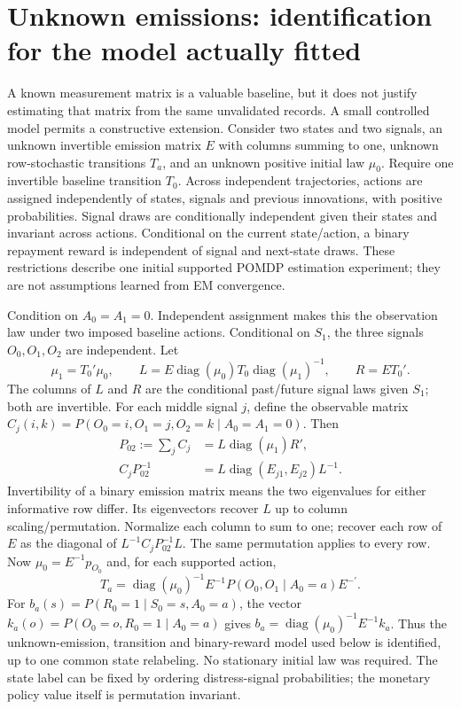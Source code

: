 \section{Unknown emissions: identification for the model actually fitted}
\label{s4:unknown-emission}
A known measurement matrix is a valuable baseline, but it does not justify
estimating that matrix from the same unvalidated records. A small controlled
model permits a constructive extension. Consider two states and two signals,
an unknown invertible emission matrix $E$ with columns summing to one,
unknown row-stochastic transitions $T_a$, and an unknown positive initial
law $\mu_0$. Require one invertible baseline transition $T_0$. Across
independent trajectories, actions are assigned independently of states,
signals and previous innovations, with positive probabilities. Signal
draws are conditionally independent given their states and invariant across
actions. Conditional on the current state/action, a binary repayment reward
is independent of signal and next-state draws. These restrictions describe
one initial supported POMDP estimation experiment; they are not assumptions
learned from EM convergence.

Condition on $A_0=A_1=0$. Independent assignment makes this the observation
law under two imposed baseline actions. Conditional on $S_1$, the three
signals $O_0,O_1,O_2$ are independent. Let
\[
 \mu_1=T_0'\mu_0,\qquad
 L=E\operatorname{diag}(\mu_0)T_0\operatorname{diag}(\mu_1)^{-1},
 \qquad R=ET_0'.
\]
The columns of $L$ and $R$ are the conditional past/future signal laws
given $S_1$; both are invertible. For each middle signal $j$, define the
observable matrix $C_j(i,k)=P(O_0=i,O_1=j,O_2=k\mid A_0=A_1=0)$.
Then
\begin{align}
 P_{02}:=\sum_jC_j&=L\operatorname{diag}(\mu_1)R',\nonumber\\
 C_jP_{02}^{-1}&=L\operatorname{diag}(E_{j1},E_{j2})L^{-1}.
 \label{s4:controlled-spectral}
\end{align}
Invertibility of a binary emission matrix means the two eigenvalues for
either informative row differ. Its eigenvectors recover $L$ up to
column scaling/permutation. Normalize each column to sum to one; recover
each row of $E$ as the diagonal of $L^{-1}C_jP_{02}^{-1}L$.
The same permutation applies to every row. Now
$\mu_0=E^{-1}p_{O_0}$ and, for each supported action,
\begin{equation}
 T_a=\operatorname{diag}(\mu_0)^{-1}E^{-1}
 P(O_0,O_1\mid A_0=a)E^{-\prime}.
 \label{s4:unknown-transition-recovery}
\end{equation}
For $b_a(s)=P(R_0=1\mid S_0=s,A_0=a)$, the vector
$k_a(o)=P(O_0=o,R_0=1\mid A_0=a)$ gives
$b_a=\operatorname{diag}(\mu_0)^{-1}E^{-1}k_a$.
Thus the unknown-emission, transition and binary-reward model used below
is identified, up to one common state relabeling. No stationary initial
law was required. The state label can be fixed by ordering distress-signal
probabilities; the monetary policy value itself is permutation invariant.

